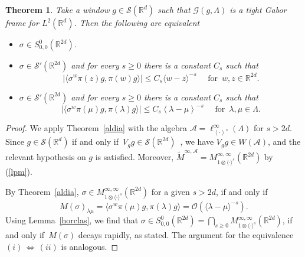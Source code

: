 \documentclass[12pt]{amsart}
\newtheorem{theorem}{Theorem}[section]
\theoremstyle{definition}
\theoremstyle{remark}
\numberwithin{equation}{section}
\def\cS{\mathcal{S}}
\def\cO{\mathcal{O}}
\def\bR{{\mathbb{R}}}
\def\rd{\bR^d}
\def\rdd{{\bR^{2d}}}
\def\<{\left<}
\def\>{\right>}
\def\cS{\mathcal{S}}
\def\cO{\mathcal{O}}
\newcommand{\fif}{if and only if}
\newcommand{\Cal}{\mathcal}
\newcommand{\La}{\Lambda}
\newcommand{\lan}{\langle}
\newcommand{\ran}{\rangle}
\newcommand{\ac}{\Cal A}
\begin{document}
\begin{theorem}\label{hordia}
Take a window $g\in\Cal S(\rd)$ such that $\Cal G(g,\Lambda)$ is a
tight Gabor frame for $L^2(\rd)$. Then the following are
equivalent
\begin{itemize}
\item[(i)] $\sigma\in S_{0,0}^0(\rdd)$.
\item[(ii)] $\sigma\in \Cal S'(\rdd)$ and for every $s\ge 0$ there is a
constant $C_s$ such that
\begin{equation} \label{eq:6c}
|\lan \sigma^{w}\pi(z)g,\pi(w)g\ran|\le C_s \lan w-z\ran^{-s}
\quad \text{ for }\, w,z\in\rdd.
\end{equation}
\item[(iii)] $\sigma\in \Cal S'(\rdd)$ and for every $s\ge 0$ there is a
constant $C_s$ such that
\begin{equation} \label{eq:6d}
|\lan \sigma^{w}\pi(\mu)g,\pi(\lambda)g\ran|\le C_s
\<\lambda-\mu\>^{-s} \quad \text{ for }\, \lambda,\mu\in\Lambda.
\end{equation}
\end{itemize}
\end{theorem}

\begin{proof} We apply  Theorem~\ref{aldia} with the
algebra $\Cal A=\ell^\infty_{\<\cdot\>^s}(\La)$ for $s>2d$. Since
$g\in\Cal S(\rd)$ \fif\ $V_gg \in \cS (\rdd )$~\cite{folland89,book}, we have
$V_gg\in W(\ac)$, and the relevant hypothesis on $g$ is satisfied.
Moreover, $\widetilde
{M}^{\infty,\ac}=M^{\infty,\infty}_{1\otimes\lan\cdot\ran^s}(\rdd)$
by (\ref{lpm}).

By  Theorem~\ref{aldia},   $\sigma\in
M^{\infty,\infty}_{1\otimes\lan\cdot\ran^s}(\rdd)$ for a given $s>
2d$, if and only if $$M(\sigma )_{\lambda \mu } = \langle \sigma
^w \pi (\mu )g,\pi (\lambda )g\rangle = \cO (\langle \lambda - \mu
\rangle ^{-s}).$$ Using Lemma~\ref{horclas},  we find that $\sigma
\in
S_{0,0}^0(\rdd)=\bigcap_{s\ge0}M^{\infty,\infty}_{1\otimes\lan\cdot\ran^s}(\rdd)$,
\fif\ $M(\sigma ) $ decays rapidly, as stated. The argument for
the equivalence $(i) \,  \Leftrightarrow \,(ii) $ is analogous.
\end{proof}
\end{document}
